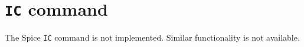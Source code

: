 %
%
%
%
\section{{\tt IC} command}
The Spice {\tt IC} command is not implemented.  Similar functionality is
not available.
